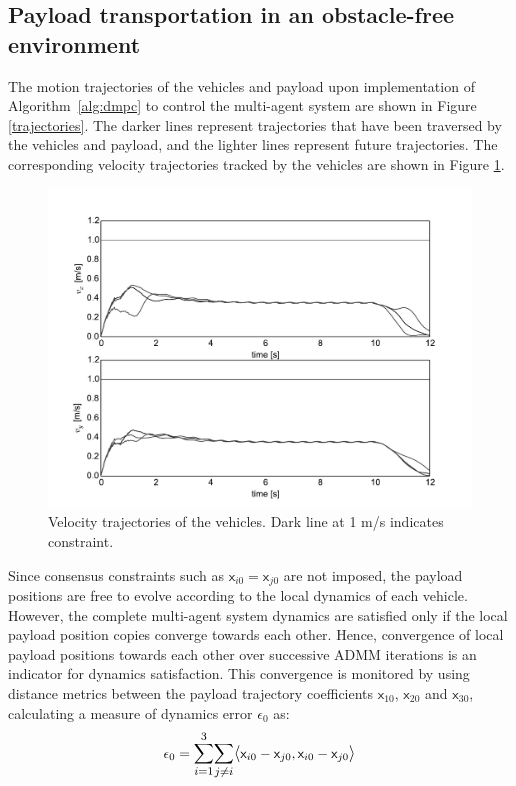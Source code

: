 \documentclass[letterpaper, 10 pt, conference]{ieeeconf}
\newcommand{\cx}{\textsf{x}}
\begin{document}
\subsection{Payload transportation in an obstacle-free environment}
The motion trajectories of the vehicles and payload upon implementation of Algorithm~\ref{alg:dmpc} to control the multi-agent system are shown in Figure \ref{trajectories}. The darker lines represent trajectories that have been traversed by the vehicles and payload, and the lighter lines represent future trajectories. The corresponding velocity trajectories tracked by the vehicles are shown in Figure \ref{velocities}. 
\begin{figure}[H]
	\centering
	\includegraphics[scale=0.40]{figures/velocities_gray.pdf}
	\caption{Velocity trajectories of the vehicles. Dark line at 1 m/s indicates constraint.}
	\label{velocities}
\end{figure}
\indent
Since consensus constraints such as $\cx_{i0} = \cx_{j0}$ are not imposed, the payload positions are free to evolve according to the local dynamics of each vehicle. However, the complete multi-agent system dynamics are satisfied only if the local payload position copies converge towards each other. Hence, convergence of local payload positions towards each other over successive ADMM iterations is an indicator for dynamics satisfaction. This convergence is monitored by using distance metrics between the payload trajectory coefficients $\cx_{10}$, $\cx_{20}$ and $\cx_{30}$,  calculating a measure of dynamics error $\epsilon_0$ as:
\begin{equation}
\epsilon_0 = \mathlarger{\sum_{i=1}^{3}} \mathlarger{\sum_{j \neq i}} \mathlarger{\langle} \cx_{i0} - \cx_{j0},\cx_{i0} - \cx_{j0} \mathlarger{\rangle}
\end{equation}
\end{document}
